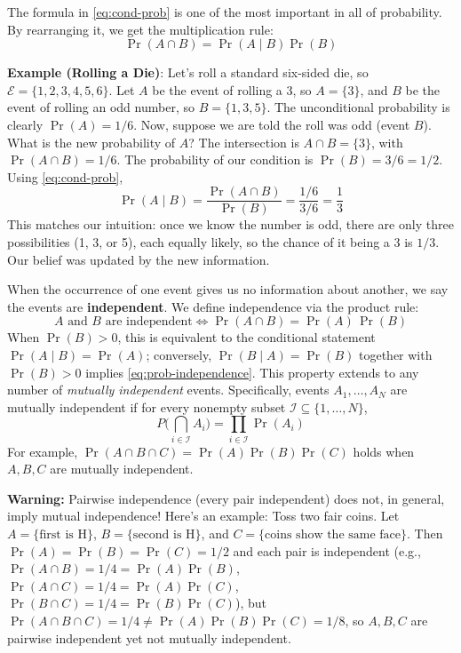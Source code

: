 The formula in \autoref{eq:cond-prob} is one of the most important in all of probability. By rearranging it, we get the multiplication rule:
\begin{equation}
    \Pr(A \cap B) = \Pr(A \mid B)\Pr(B)
    \label{eq:mult-rule}
\end{equation}

\begin{exampleBox}
    \textbf{Example (Rolling a Die)}: Let's roll a standard six-sided die, so $\mathcal{E} = \{1, 2, 3, 4, 5, 6\}$. Let $A$ be the event of rolling a 3, so $A=\{3\}$, and $B$ be the event of rolling an odd number, so $B=\{1, 3, 5\}$. The unconditional probability is clearly $\Pr(A) = 1/6$. Now, suppose we are told the roll was odd (event $B$). What is the new probability of $A$? The intersection is $A \cap B = \{3\}$, with $\Pr(A \cap B)=1/6$. The probability of our condition is $\Pr(B)=3/6 = 1/2$. Using \autoref{eq:cond-prob}, 
    \begin{equation}
        \Pr(A \mid B) = \frac{\Pr(A \cap B)}{\Pr(B)} = \frac{1/6}{3/6} = \frac{1}{3}
    \end{equation}
    This matches our intuition: once we know the number is odd, there are only three possibilities (1, 3, or 5), each equally likely, so the chance of it being a 3 is $1/3$. Our belief was updated by the new information.
\end{exampleBox}

When the occurrence of one event gives us no information about another, we say the events are \textbf{independent}. We define independence via the product rule:
\begin{equation}
    \text{$A$ and $B$ are independent} \iff \Pr(A \cap B) = \Pr(A)\,\Pr(B)
    \label{eq:prob-independence}
\end{equation}
When $\Pr(B)>0$, this is equivalent to the conditional statement $\Pr(A\mid B)=\Pr(A)$; conversely, $\Pr(B\mid A)=\Pr(B)$ together with $\Pr(B)>0$ implies \autoref{eq:prob-independence}. This property extends to any number of \emph{mutually independent} events. Specifically, events $A_1,\dots,A_N$ are mutually independent if for every nonempty subset $\mathcal{I}\subseteq\{1,\dots,N\}$,
\begin{equation}
    P\!\Big(\bigcap_{i\in \mathcal{I}} A_i\Big) = \prod_{i\in \mathcal{I}} \Pr(A_i)
\end{equation}
For example, $\Pr(A\cap B\cap C)=\Pr(A)\Pr(B)\Pr(C)$ holds when $A,B,C$ are mutually independent.

\begin{warningBox}
    \textbf{Warning:} Pairwise independence (every pair independent) does not, in general, imply mutual independence! Here's an example: Toss two fair coins. Let $A=\{\text{first is H}\}$, $B=\{\text{second is H}\}$, and $C=\{\text{coins show the same face}\}$. Then $\Pr(A)=\Pr(B)=\Pr(C)=1/2$ and each pair is independent (e.g., $\Pr(A\cap B)=1/4=\Pr(A)\Pr(B)$, $\Pr(A\cap C)=1/4=\Pr(A)\Pr(C)$, $\Pr(B\cap C)=1/4=\Pr(B)\Pr(C)$), but $\Pr(A\cap B\cap C)=1/4 \neq \Pr(A)\Pr(B)\Pr(C)=1/8$, so $A,B,C$ are pairwise independent yet not mutually independent.
\end{warningBox}

